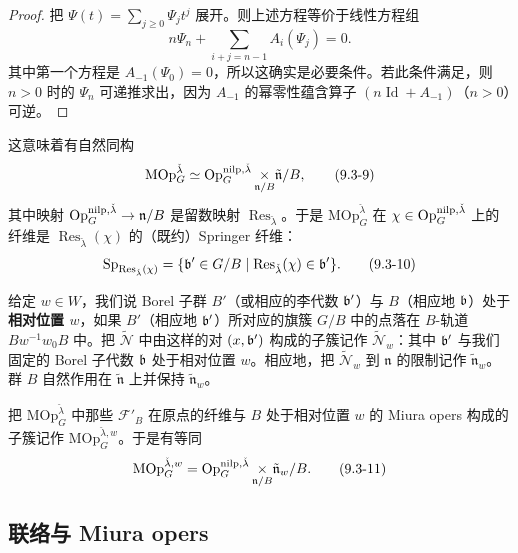 \begin{proof}
把 $\Psi(t) = \sum_{j\ge 0}\Psi_jt^j$ 展开。则上述方程等价于线性方程组
\begin{equation}
n\Psi_n + \sum_{i+j=n-1}A_i(\Psi_j) = 0.
\tag{9.3-8}
\end{equation}
其中第一个方程是 $A_{-1}(\Psi_0)=0$，所以这确实是必要条件。若此条件满足，则 $n>0$ 时的 $\Psi_n$ 可递推求出，因为 $A_{-1}$ 的幂零性蕴含算子 $(n\operatorname{Id}+A_{-1})$（$n>0$）可逆。
\end{proof}

这意味着有自然同构
\begin{equation}
\mathrm{MOp}^{\check\lambda}_G\simeq\operatorname{Op}^{\mathrm{nilp},\check\lambda}_G\underset{\mathfrak{n}/B}{\times}\tilde{\mathfrak{n}}/B,
\tag{9.3-9}
\end{equation}
其中映射 $\operatorname{Op}^{\mathrm{nilp},\check\lambda}_G\to\mathfrak{n}/B$ 是留数映射 $\operatorname{Res}_{\check\lambda}$。于是 $\mathrm{MOp}^{\check\lambda}_G$ 在 $\chi\in\operatorname{Op}^{\mathrm{nilp},\check\lambda}_G$ 上的纤维是 $\operatorname{Res}_{\check\lambda}(\chi)$ 的（既约）Springer 纤维：
\begin{equation}
\mathrm{Sp}_{\operatorname{Res}_{\check\lambda}(\chi)} = \{\mathfrak{b}'\in G/B\mid \operatorname{Res}_{\check\lambda}(\chi)\in\mathfrak{b}'\}.
\tag{9.3-10}
\end{equation}

给定 $w\in W$，我们说 Borel 子群 $B'$（或相应的李代数 $\mathfrak{b}'$）与 $B$（相应地 $\mathfrak{b}$）处于\textbf{相对位置 $w$}，如果 $B'$（相应地 $\mathfrak{b}'$）所对应的旗簇 $G/B$ 中的点落在 $B$-轨道 $Bw^{-1}w_0B$ 中。把 $\widetilde{\mathcal{N}}$ 中由这样的对 $(x,\mathfrak{b}')$ 构成的子簇记作 $\widetilde{\mathcal{N}}_w$：其中 $\mathfrak{b}'$ 与我们固定的 Borel 子代数 $\mathfrak{b}$ 处于相对位置 $w$。相应地，把 $\widetilde{\mathcal{N}}_w$ 到 $\mathfrak{n}$ 的限制记作 $\tilde{\mathfrak{n}}_w$。群 $B$ 自然作用在 $\tilde{\mathfrak{n}}$ 上并保持 $\tilde{\mathfrak{n}}_w$。

把 $\mathrm{MOp}^{\check\lambda}_G$ 中那些 $\mathcal{F}'_B$ 在原点的纤维与 $B$ 处于相对位置 $w$ 的 Miura opers 构成的子簇记作 $\mathrm{MOp}^{\check\lambda,w}_G$。于是有等同
\begin{equation}
\mathrm{MOp}^{\check\lambda,w}_G = \operatorname{Op}^{\mathrm{nilp},\check\lambda}_G\underset{\mathfrak{n}/B}{\times}\tilde{\mathfrak{n}}_w/B.
\tag{9.3-11}
\end{equation}

\subsection{联络与 Miura opers}

